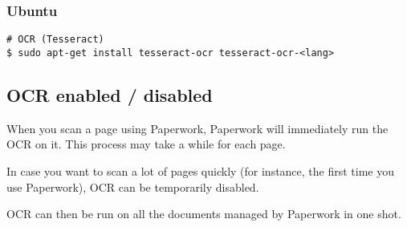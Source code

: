 \documentclass[10pt,a4paper]{article}
\begin{document}
\subsubsection{Ubuntu}
\begin{verbatim}
# OCR (Tesseract)
$ sudo apt-get install tesseract-ocr tesseract-ocr-<lang> 
\end{verbatim}

\subsection{OCR enabled / disabled}

When you scan a page using Paperwork, Paperwork will immediately run
the OCR on it. This process may take a while for each page.

In case you want to scan a lot of pages quickly (for instance, the
first time you use Paperwork), OCR can be temporarily disabled.


OCR can then be run on all the documents managed by Paperwork in one
shot.

\end{document}
